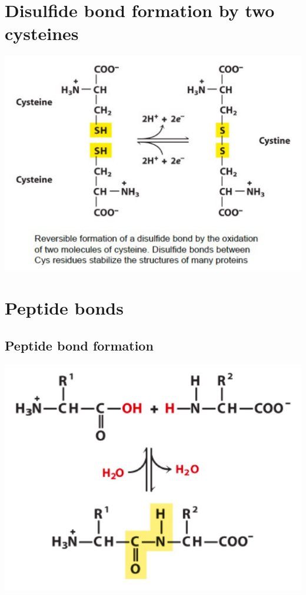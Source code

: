 \documentclass[11pt]{article}
\begin{document}
\section{Disulfide bond formation by two cysteines}
\label{sec:org5434ada}
\begin{center}
\includegraphics[width=.9\linewidth]{./images/cysteine-disulfide-bond-formation.png}
\end{center}


\section{Peptide bonds}
\label{sec:org073381b}

\subsection{Peptide bond formation}
\label{sec:orgd0754ff}
\begin{center}
\includegraphics[width=.9\linewidth]{./images/peptide-bond-formation.png}
\end{center}
\end{document}
